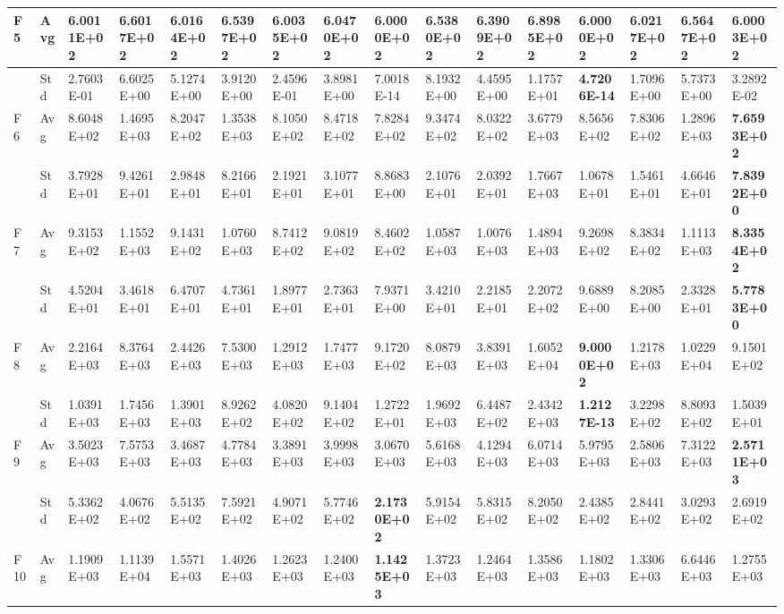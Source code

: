 \documentclass{article} %
\begin{document}
\begin{tabular}{|p{0.3in}|p{0.3in}|p{0.3in}|p{0.3in}|p{0.3in}|p{0.3in}|p{0.3in}|p{0.3in}|p{0.3in}|p{0.3in}|p{0.3in}|p{0.3in}|p{0.3in}|p{0.3in}|p{0.3in}|p{0.5in}|}
F5 & Avg & 6.0011E+02 & 6.6017E+02 & 6.0164E+02 & 6.5397E+02 & 6.0035E+02 & 6.0470E+02 & \textbf{6.0000E+02} & 6.5380E+02 & 6.3909E+02 & 6.8985E+02 & \textbf{6.0000E+02} & 6.0217E+02 & 6.5647E+02 & 6.0003E+02 \\ \hline 
 & Std & 2.7603E-01 & 6.6025E+00 & 5.1274E+00 & 3.9120E+00 & 2.4596E-01 & 3.8981E+00 & 7.0018E-14 & 8.1932E+00 & 4.4595E+00 & 1.1757E+01 & \textbf{4.7206E-14} & 1.7096E+00 & 5.7373E+00 & 3.2892E-02 \\ \hline 
F6 & Avg & 8.6048E+02 & 1.4695E+03 & 8.2047E+02 & 1.3538E+03 & 8.1050E+02 & 8.4718E+02 & 7.8284E+02 & 9.3474E+02 & 8.0322E+02 & 3.6779E+03 & 8.5656E+02 & 7.8306E+02 & 1.2896E+03 & \textbf{7.6593E+02} \\ \hline 
 & Std & 3.7928E+01 & 9.4261E+01 & 2.9848E+01 & 8.2166E+01 & 2.1921E+01 & 3.1077E+01 & 8.8683E+00 & 2.1076E+01 & 2.0392E+01 & 1.7667E+03 & 1.0678E+01 & 1.5461E+01 & 4.6646E+01 & \textbf{7.8392E+00} \\ \hline 
F7 & Avg & 9.3153E+02 & 1.1552E+03 & 9.1431E+02 & 1.0760E+03 & 8.7412E+02 & 9.0819E+02 & 8.4602E+02 & 1.0587E+03 & 1.0076E+03 & 1.4894E+03 & 9.2698E+02 & 8.3834E+02 & 1.1113E+03 & \textbf{8.3354E+02} \\ \hline 
 & Std & 4.5204E+01 & 3.4618E+01 & 6.4707E+01 & 4.7361E+01 & 1.8977E+01 & 2.7363E+01 & 7.9371E+00 & 3.4210E+01 & 2.2185E+01 & 2.2072E+02 & 9.6889E+00 & 8.2085E+00 & 2.3328E+01 & \textbf{5.7783E+00} \\ \hline 
F8 & Avg & 2.2164E+03 & 8.3764E+03 & 2.4426E+03 & 7.5300E+03 & 1.2912E+03 & 1.7477E+03 & 9.1720E+02 & 8.0879E+03 & 3.8391E+03 & 1.6052E+04 & \textbf{9.0000E+02} & 1.2178E+03 & 1.0229E+04 & 9.1501E+02 \\ \hline 
 & Std & 1.0391E+03 & 1.7456E+03 & 1.3901E+03 & 8.9262E+02 & 4.0820E+02 & 9.1404E+02 & 1.2722E+01 & 1.9692E+03 & 6.4487E+02 & 2.4342E+03 & \textbf{1.2127E-13} & 3.2298E+02 & 8.8093E+02 & 1.5039E+01 \\ \hline 
F9 & Avg & 3.5023E+03 & 7.5753E+03 & 3.4687E+03 & 4.7784E+03 & 3.3891E+03 & 3.9998E+03 & 3.0670E+03 & 5.6168E+03 & 4.1294E+03 & 6.0714E+03 & 5.9795E+03 & 2.5806E+03 & 7.3122E+03 & \textbf{2.5711E+03} \\ \hline 
 & Std & 5.3362E+02 & 4.0676E+02 & 5.5135E+02 & 7.5921E+02 & 4.9071E+02 & 5.7746E+02 & \textbf{2.1730E+02} & 5.9154E+02 & 5.8315E+02 & 8.2050E+02 & 2.4385E+02 & 2.8441E+02 & 3.0293E+02 & 2.6919E+02 \\ \hline 
F10 & Avg & 1.1909E+03 & 1.1139E+04 & 1.5571E+03 & 1.4026E+03 & 1.2623E+03 & 1.2400E+03 & \textbf{1.1425E+03} & 1.3723E+03 & 1.2464E+03 & 1.3586E+03 & 1.1802E+03 & 1.3306E+03 & 6.6446E+03 & 1.2755E+03 \\ \hline 

\end{tabular}
\end{document}
